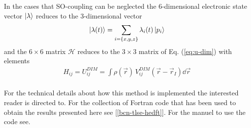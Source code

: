 			In the cases that SO-coupling can be neglected the 6-dimensional electronic state vector $\ket{\lambda}$ reduces to the 3-dimensional vector
			\begin{align}
				\ket{\lambda(t)} = \sum_{i=\{x,y,z\}} \lambda_{i}(t) \ket{p_i}
			\end{align}
			and the $6\times6$ matrix $\mathcal{H}$ reduces to the $3\times 3$ matrix of Eq. (\ref{eq:u-dim}) with elements
			\begin{align}
				H_{ij} = U^{DIM}_{ij} = \int\!\rho(\vec{r})\,V^{DIM}_{ij}(\vec{r}-\vec{r}_I)\dd{\vec{r}}
			\end{align}\\
			
			For the technical details about how this method is implemented the interested reader is directed to\citep{dft-guide}. For the collection of Fortran code that has been used to obtain the results presented here see [\ref{bcn-tlse-hedft}]. For the manuel to use the code see\citep{dft-guide}.
